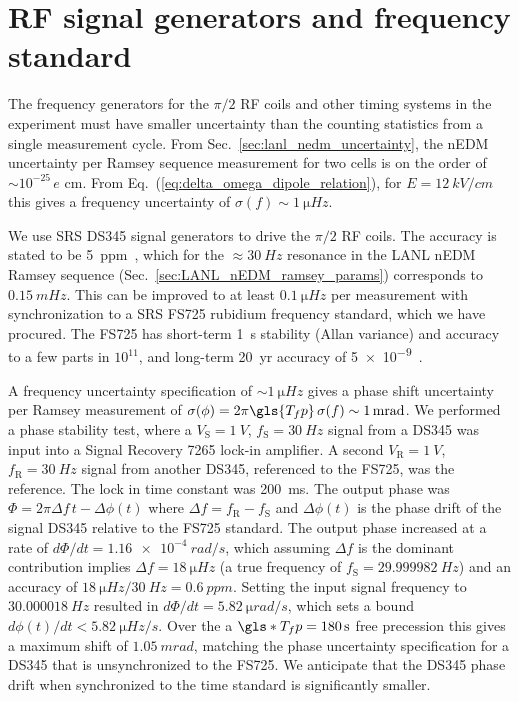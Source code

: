 
\section{RF signal generators and frequency standard}\label{sec:pulse_gen_freq_std}


The frequency generators for the $\pi/2$ RF coils and other timing systems in the experiment must have smaller uncertainty than the counting statistics from a single measurement cycle. From Sec.~\ref{sec:lanl_nedm_uncertainty}, the nEDM uncertainty per Ramsey sequence measurement for two cells is on the order of $\sim 10^{-25}\,e\text{ cm}$. From Eq.~(\ref{eq:delta_omega_dipole_relation}), for $E=\qty{12}{kV\per cm}$ this gives a frequency uncertainty of $\sigma(f)\sim \qty{1}{\micro Hz}$.

We use SRS DS345 signal generators to drive the $\pi/2$ RF coils. The accuracy is stated to be \qty{5}{ppm}~\cite{ds345_manual}, which for the $\approx\qty{30}{Hz}$ resonance in the LANL nEDM Ramsey sequence (Sec.~\ref{sec:LANL_nEDM_ramsey_params}) corresponds to $\qty{0.15}{mHz}$. This can be improved to at least $\qty{0.1}{\micro Hz}$ per measurement with synchronization to a SRS FS725 rubidium frequency standard, which we have procured. The FS725 has short-term \qty{1}{s} stability (Allan variance) and accuracy to a few parts in $10^{11}$, and long-term \qty{20}{yr} accuracy of \num{5e-9}~\cite{rubidium_standard_fs725_manual}.

A frequency uncertainty specification of $\sim \qty{1}{\micro Hz}$ gives a phase shift uncertainty per Ramsey measurement of $\sigma(\phi)=2\pi\gls{T_fp}\,\sigma(f)\sim \qty{1}{mrad}$. We performed a phase stability test, where a $V_\text{S}=\qty{1}{V}$, $f_\text{S}=\qty{30}{Hz}$ signal from a DS345 was input into a Signal Recovery 7265 lock-in amplifier. A second $V_\text{R}=\qty{1}{V}$, $f_\text{R}=\qty{30}{Hz}$ signal from another DS345, referenced to the FS725, was the reference. The lock in time constant was \qty{200}{ms}. The output phase was $\Phi=2\pi \Delta f\,t-\Delta\phi(t)$ where $\Delta f=f_\text{R}-f_\text{S}$ and $\Delta\phi(t)$ is the phase drift of the signal DS345 relative to the FS725 standard. The output phase increased at a rate of $d\Phi/dt=\qty{1.16e-4}{rad\per s}$, which assuming $\Delta f$ is the dominant contribution implies $\Delta f=\qty{18}{\micro Hz}$ (a true frequency of $f_\text{S}=\qty{29.999982}{Hz}$) and an accuracy of $\qty{18}{\micro Hz}/\qty{30}{Hz}=\qty{0.6}{ppm}$. Setting the input signal frequency to $\qty{30.000018}{Hz}$ resulted in $d\Phi/dt=\qty{5.82}{\micro rad\per s}$, which sets a bound $d\phi(t)/dt<\qty{5.82}{\micro Hz\per s}$. Over the a $\gls*{T_fp}=\qty{180}{s}$ free precession this gives a maximum shift of $\qty{1.05}{mrad}$, matching the phase uncertainty specification for a DS345 that is unsynchronized to the FS725. We anticipate that the DS345 phase drift when synchronized to the time standard is significantly smaller.

